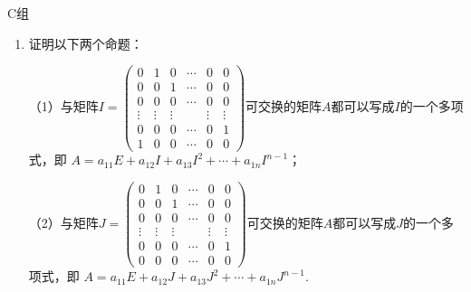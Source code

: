 \centerline{\heiti C组}
\begin{enumerate}
    \item 证明以下两个命题：
	
	（1）与矩阵$I=\begin{pmatrix}
		0 & 1 & 0 & \cdots & 0 & 0 \\
		0 & 0 & 1 & \cdots & 0 & 0 \\
		0 & 0 & 0 & \cdots & 0 & 0 \\
		\vdots & \vdots & \vdots &  & \vdots & \vdots \\
		0 & 0 & 0 & \cdots & 0 & 1 \\
		1 & 0 & 0 & \cdots & 0 & 0
	\end{pmatrix}$可交换的矩阵$A$都可以写成$I$的一个多项式，即
	$A=a_{11}E+a_{12}I+a_{13}I^2+\cdots+a_{1n}I^{n-1}$；
	
	（2）与矩阵$J=\begin{pmatrix}
		0 & 1 & 0 & \cdots & 0 & 0 \\
		0 & 0 & 1 & \cdots & 0 & 0 \\
		0 & 0 & 0 & \cdots & 0 & 0 \\
		\vdots & \vdots & \vdots &  & \vdots & \vdots \\
		0 & 0 & 0 & \cdots & 0 & 1 \\
		0 & 0 & 0 & \cdots & 0 & 0
	\end{pmatrix}$可交换的矩阵$A$都可以写成$J$的一个多项式，即
	$A=a_{11}E+a_{12}J+a_{13}J^2+\cdots+a_{1n}J^{n-1}$.
\end{enumerate}

